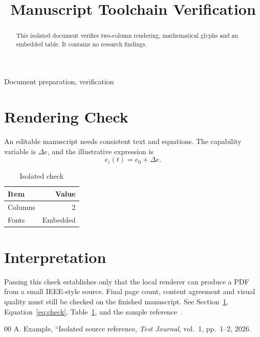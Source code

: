 \documentclass[conference,a4paper]{IEEEtran}
\begin{document}
\title{Manuscript Toolchain Verification}
\author{}
\maketitle
\begin{abstract}This isolated document verifies two-column rendering, mathematical glyphs and an embedded table. It contains no research findings.\end{abstract}
\begin{IEEEkeywords}Document preparation, verification\end{IEEEkeywords}
\section{Rendering Check}\label{sec:check}
An editable manuscript needs consistent text and equations. The capability variable is $\Delta e$, and the illustrative expression is
\begin{equation} e_i(t)=e_0+\Delta e.\label{eq:check}\end{equation}
\begin{table}[h]\centering\caption{Isolated check}\label{tab:check}\begin{tabular}{lr}\toprule Item&Value\\\midrule Columns&2\\Fonts&Embedded\\\bottomrule\end{tabular}\end{table}
\section{Interpretation}
Passing this check establishes only that the local renderer can produce a PDF from a small IEEE-style source. Final page count, content agreement and visual quality must still be checked on the finished manuscript.
See Section~\ref{sec:check}, Equation~\ref{eq:check}, Table~\ref{tab:check}, and the sample reference~\cite{sample}.
\begin{thebibliography}{00}
 A. Example, ``Isolated source reference, \emph{Test Journal}, vol.~1, pp.~1--2, 2026.
\end{thebibliography}
\end{document}
